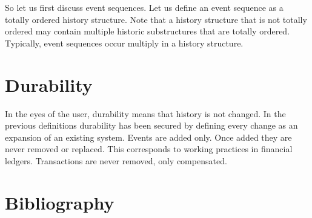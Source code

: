 \documentclass{elsarticle}
\begin{document}
	So let us first discuss event sequences.
	Let us define an event sequence as a totally ordered history structure.
	Note that a history structure that is not totally ordered may contain multiple historic substructures
	that are totally ordered.
	Typically, event sequences occur multiply in a history structure.

\section{Durability}
\label{sct:Durability}
	In the eyes of the user, durability means that history is not changed.
	In the previous definitions durability has been secured by defining every change as an expansion of an existing system.
	Events are added only. Once added they are never removed or replaced.
	This corresponds to working practices in financial ledgers.
	Transactions are never removed, only compensated.

\section{Bibliography}


\end{document}
